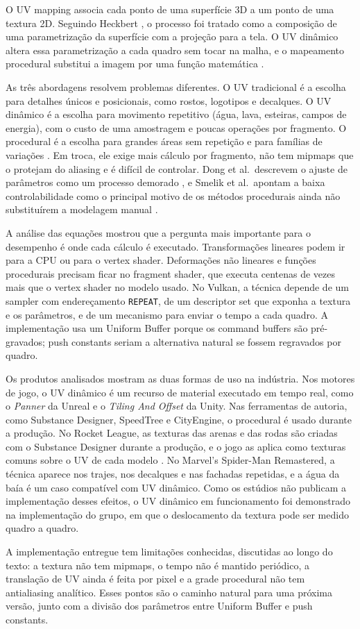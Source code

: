 
O UV mapping associa cada ponto de uma superfície 3D a um ponto de uma textura 2D. Seguindo Heckbert \cite[p.~2]{heckbert1986}, o processo foi tratado como a composição de uma parametrização da superfície com a projeção para a tela. O UV dinâmico altera essa parametrização a cada quadro sem tocar na malha, e o mapeamento procedural substitui a imagem por uma função matemática \cite[p.~1]{dong2020}.

As três abordagens resolvem problemas diferentes. O UV tradicional é a escolha para detalhes únicos e posicionais, como rostos, logotipos e decalques. O UV dinâmico é a escolha para movimento repetitivo (água, lava, esteiras, campos de energia), com o custo de uma amostragem e poucas operações por fragmento. O procedural é a escolha para grandes áreas sem repetição e para famílias de variações \cite[p.~2]{dong2020}. Em troca, ele exige mais cálculo por fragmento, não tem mipmaps que o protejam do aliasing e é difícil de controlar. Dong et al.\ descrevem o ajuste de parâmetros como um processo demorado \cite[p.~23]{dong2020}, e Smelik et al.\ apontam a baixa controlabilidade como o principal motivo de os métodos procedurais ainda não substituírem a modelagem manual \cite[p.~1]{smelik2014}.

A análise das equações mostrou que a pergunta mais importante para o desempenho é onde cada cálculo é executado. Transformações lineares podem ir para a CPU ou para o vertex shader. Deformações não lineares e funções procedurais precisam ficar no fragment shader, que executa centenas de vezes mais que o vertex shader no modelo usado. No Vulkan, a técnica depende de um sampler com endereçamento \texttt{REPEAT}, de um descriptor set que exponha a textura e os parâmetros, e de um mecanismo para enviar o tempo a cada quadro. A implementação usa um Uniform Buffer porque os command buffers são pré-gravados; push constants seriam a alternativa natural se fossem regravados por quadro.

Os produtos analisados mostram as duas formas de uso na indústria. Nos motores de jogo, o UV dinâmico é um recurso de material executado em tempo real, como o \textit{Panner} da Unreal e o \textit{Tiling And Offset} da Unity. Nas ferramentas de autoria, como Substance Designer, SpeedTree e CityEngine, o procedural é usado durante a produção. No Rocket League, as texturas das arenas e das rodas são criadas com o Substance Designer durante a produção, e o jogo as aplica como texturas comuns sobre o UV de cada modelo \cite{substance}. No Marvel's Spider-Man Remastered, a técnica aparece nos trajes, nos decalques e nas fachadas repetidas, e a água da baía é um caso compatível com UV dinâmico. Como os estúdios não publicam a implementação desses efeitos, o UV dinâmico em funcionamento foi demonstrado na implementação do grupo, em que o deslocamento da textura pode ser medido quadro a quadro.

A implementação entregue tem limitações conhecidas, discutidas ao longo do texto: a textura não tem mipmaps, o tempo não é mantido periódico, a translação de UV ainda é feita por pixel e a grade procedural não tem antialiasing analítico. Esses pontos são o caminho natural para uma próxima versão, junto com a divisão dos parâmetros entre Uniform Buffer e push constants.
